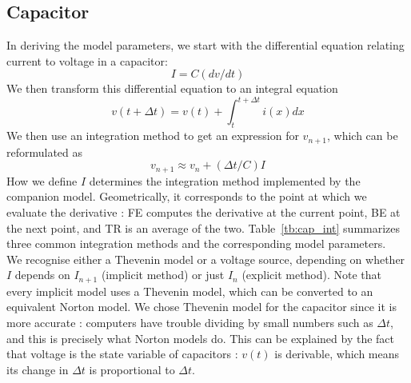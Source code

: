 \documentclass{article}
\begin{document}
\subsection{Capacitor}
In deriving the model parameters, we start with the differential equation relating current to voltage in a capacitor:
\begin{equation}
I=C(dv/dt)
\end{equation}
We then transform this differential equation to an integral equation 
\begin{equation}
v(t+\Delta t) = v(t) + \int_t^{t+\Delta t} i(x) dx
\end{equation}
We then use an integration method to get an expression for $v_{n+1}$, which can be reformulated as
\begin{equation}
v_{n+1} \approx v_n+(\Delta t/C)I
\end{equation}
How we define $I$ determines the integration method implemented by the companion model. Geometrically, it corresponds to the point at which we evaluate the derivative : FE computes the derivative at the current point, BE at the next point, and TR is an average of the two. Table~\ref{tb:cap_int} summarizes three common integration methods and the corresponding model parameters.\\
We recognise either a Thevenin model or a voltage source, depending on whether $I$ depends on $I_{n+1}$ (implicit method) or just $I_n$ (explicit method). Note that every implicit model uses a Thevenin model, which can be converted to an equivalent Norton model. We chose Thevenin model for the capacitor since it is more accurate : computers have trouble dividing by small numbers such as $\Delta t$, and this is precisely what Norton models do. This can be explained by the fact that voltage is the state variable of capacitors : $v(t)$ is derivable, which means its change in $\Delta t$ is proportional to $\Delta t$.
\end{document}
